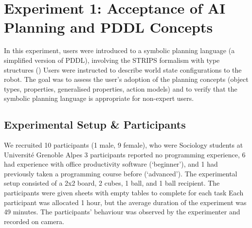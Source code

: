 
\section{Experiment 1: Acceptance of AI Planning and PDDL Concepts}\label{sec:Exp1}

In this experiment, users were introduced to a symbolic planning language (a simplified version of PDDL), involving the STRIPS formalism with type structures ()
Users were instructed to describe world state configurations to the robot.
The goal was to assess the user's adoption of the planning concepts (object types, properties, generalised properties, action models) and to verify that the symbolic planning language is appropriate for non-expert users.

\subsection{Experimental Setup \& Participants}
We recruited 10 participants (1 male, 9 female), who were Sociology students at Universit\'{e} Grenoble Alpes
3 participants reported no programming experience, 6  had experience with office productivity software (`beginner'), and 1 had previously taken a programming course before (`advanced').
%
The experimental setup consisted of a 2x2 board, 2 cubes, 1 ball, and 1 ball recipient.
The participants were given sheets with empty tables to complete for each task
Each participant was allocated 1 hour, but the average duration of the experiment was 49 minutes.
The participants' behaviour was observed by the experimenter and recorded on camera. 

